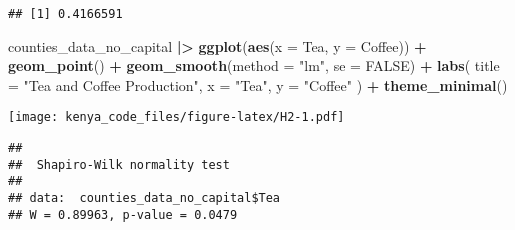 \documentclass[
]{article}
\newenvironment{Shaded}{\begin{snugshade}}{\end{snugshade}}
\newcommand{\AttributeTok}[1]{\textcolor[rgb]{0.13,0.29,0.53}{#1}}
\newcommand{\CommentTok}[1]{\textcolor[rgb]{0.56,0.35,0.01}{\textit{#1}}}
\newcommand{\ConstantTok}[1]{\textcolor[rgb]{0.56,0.35,0.01}{#1}}
\newcommand{\DocumentationTok}[1]{\textcolor[rgb]{0.56,0.35,0.01}{\textbf{\textit{#1}}}}
\newcommand{\FunctionTok}[1]{\textcolor[rgb]{0.13,0.29,0.53}{\textbf{#1}}}
\newcommand{\NormalTok}[1]{#1}
\newcommand{\OtherTok}[1]{\textcolor[rgb]{0.56,0.35,0.01}{#1}}
\newcommand{\SpecialCharTok}[1]{\textcolor[rgb]{0.81,0.36,0.00}{\textbf{#1}}}
\newcommand{\StringTok}[1]{\textcolor[rgb]{0.31,0.60,0.02}{#1}}
\begin{document}
\begin{verbatim}
## [1] 0.4166591
\end{verbatim}

\begin{Shaded}
\begin{Highlighting}[]
\NormalTok{counties\_data\_no\_capital }\SpecialCharTok{|\textgreater{}} 
  \FunctionTok{ggplot}\NormalTok{(}\FunctionTok{aes}\NormalTok{(}\AttributeTok{x =}\NormalTok{ Tea, }\AttributeTok{y =}\NormalTok{ Coffee)) }\SpecialCharTok{+}
  \FunctionTok{geom\_point}\NormalTok{() }\SpecialCharTok{+}
  \FunctionTok{geom\_smooth}\NormalTok{(}\AttributeTok{method =} \StringTok{"lm"}\NormalTok{, }\AttributeTok{se =} \ConstantTok{FALSE}\NormalTok{) }\SpecialCharTok{+}
  \FunctionTok{labs}\NormalTok{(}
    \AttributeTok{title =} \StringTok{"Tea and Coffee Production"}\NormalTok{,}
    \AttributeTok{x =} \StringTok{"Tea"}\NormalTok{,}
    \AttributeTok{y =} \StringTok{"Coffee"}
\NormalTok{  ) }\SpecialCharTok{+}
  \FunctionTok{theme\_minimal}\NormalTok{()}
\end{Highlighting}
\end{Shaded}

\texttt{[image: kenya\_code\_files/figure-latex/H2-1.pdf]}

\begin{Shaded}
\end{Shaded}

\begin{verbatim}
## 
##  Shapiro-Wilk normality test
## 
## data:  counties_data_no_capital$Tea
## W = 0.89963, p-value = 0.0479
\end{verbatim}

\begin{Shaded}
\end{Shaded}
\end{document}
